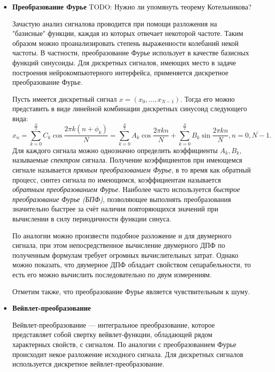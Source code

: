 \documentclass[12pt,fleqn]{article}
\begin{document}
	\begin{itemize}
	\item
	{\bf Преобразование Фурье}
	TODO: Нужно ли упомянуть теорему Котельникова?
	\par Зачастую анализ сигналова проводится при помощи разложения на "базисные" функции, каждая из которых отвечает некоторой частоте. Таким образом можно проанализировать степень выраженности колебаний некой частоты. В частности, преобразование Фурье использует в качестве базисных функций синусоиды. Для дискретных сигналов, имеющих место в задаче построения нейрокомпьютерного интерфейса, применяется дискретное преобразование Фурье.
	\par Пусть имеется дискретный сигнал $x = (x_0, \dots, x_{N-1})$. Тогда его можно представить в виде линейной комбинации дискретных синусоид следующего вида:
$$x_n = \sum_{k=0}^{\frac{N}{2}} C_k \cos{\frac{2 \pi k (n + \phi_k)}{N}} = \sum_{k=0}^{\frac{N}{2}} A_k \cos{\frac{2 \pi k n}{N}} + \sum_{k=0}^{\frac{N}{2}} B_k \sin{\frac{2 \pi k n}{N}}, n = \overline{0, N-1}.$$
	Для каждого сигнала можно однозначно определить коэффициенты $A_k, B_k,$ называемые {\it спектром} сигнала. Получение коэффициентов при имеющемся сигнале называется {\it прямым преобразованием Фурье}, в то время как обратный процесс, синтез сигнала по имеющимся, коэффициентам называется {\it обратным преобразованием Фурье}. Наиболее часто используется {\it быстрое преобразование Фурье (БПФ)}, позволяющее выполнять преобразования значительно быстрее за счёт  наличия повторяющихся значений при вычислении в силу периодичности функции синуса. 
	\par По аналогии можно произвести подобное разложение и для двумерного сигнала, при этом непосредственное вычисление двумерного ДПФ по полученным формулам требует огромных вычислительных затрат. Однако можно показать, что двумерное ДПФ обладает свойством сепарабельности, то есть его можно вычислить последовательно по двум измерениям. 
	\par Отметим также, что преобразование Фурье является чувствительным к шуму.
	\item
	{\bf Вейвлет-преобразование}
	\par Вейвлет-преобразование — интегральное преобразование, которое представляет собой свертку вейвлет-функции, обладающей рядом характерных свойств, с сигналом. По аналогии с преобразованием Фурье происходит некое разложение исходного сигнала. Для дискретных сигналов используется дискретное вейвлет-преобразование.

\end{itemize}
\end{document}
